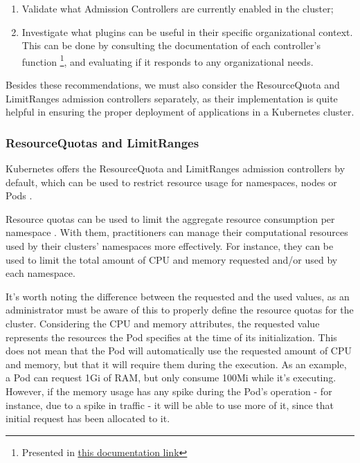 \documentclass[a4paper,11pt,openright,BCOR=15mm]{scrbook}
\begin{document}
\begin{enumerate}
	\item Validate what Admission Controllers are currently enabled in the cluster;
	\item Investigate what plugins can be useful in their specific organizational context. This can be done by consulting the documentation of each controller's function \footnote{Presented in \href{https://kubernetes.io/docs/reference/access-authn-authz/admission-controllers/\#what-does-each-admission-controller-do}{\underline{this documentation link}}}, and evaluating if it responds to any organizational needs.
\end{enumerate}

Besides these recommendations, we must also consider the ResourceQuota and LimitRanges admission controllers separately, as their implementation is quite helpful in ensuring the proper deployment of applications in a Kubernetes cluster.

\subsubsection{ResourceQuotas and LimitRanges}

Kubernetes offers the ResourceQuota and LimitRanges admission controllers by default, which can be used to restrict resource usage for namespaces, nodes or Pods \cite{national_security_agency_kubernetes_2022}.

Resource quotas can be used to limit the aggregate resource consumption per namespace \cite{the_linux_foundation_resource_2024}. With them, practitioners can manage their computational resources used by their clusters' namespaces more effectively. For instance, they can be used to limit the total amount of CPU and memory requested and/or used by each namespace.

It's worth noting the difference between the requested and the used values, as an administrator must be aware of this to properly define the resource quotas for the cluster. Considering the CPU and memory attributes, the requested value represents the resources the Pod specifies at the time of its initialization. This does not mean that the Pod will automatically use the requested amount of CPU and memory, but that it will require them during the execution. As an example, a Pod can request 1Gi of RAM, but only consume 100Mi while it's executing. However, if the memory usage has any spike during the Pod's operation - for instance, due to a spike in traffic - it will be able to use more of it, since that initial request has been allocated to it.
\end{document}
